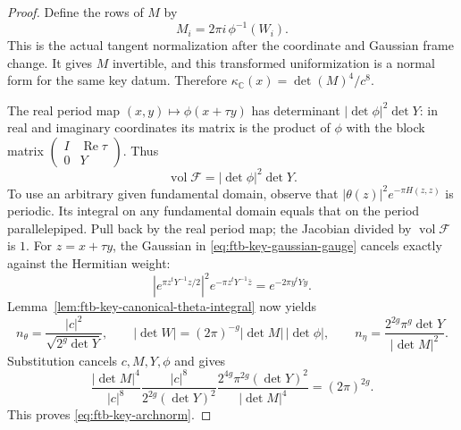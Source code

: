 \begin{proof}
Define the rows of \(M\) by
\[
                         M_i=2\pi i\,\phi^{-1}(W_i).
\]
This is the actual tangent normalization after the
coordinate and Gaussian frame change.
It gives \(M\) invertible, and this transformed
uniformization is a normal form for the same key datum.
Therefore \(\kappa_{\mathbb C}(x)=\det(M)^4/c^8\).

The real period map
\((x,y)\mapsto\phi(x+\tau y)\) has determinant
\(|\det\phi|^2\det Y\): in real and imaginary coordinates
its matrix is the product of \(\phi\) with the block
matrix \(\left(\begin{smallmatrix}I&\operatorname{Re}\tau\\0&Y
\end{smallmatrix}\right)\).
Thus
\[
                    \operatorname{vol}\mathcal F
                                   =|\det\phi|^2\det Y.
 \tag{A5}\label{eq:ftb-key-period-volume}
\]
To use an arbitrary given fundamental domain, observe
that \(|\theta(z)|^2e^{-\pi H(z,z)}\) is periodic.
Its integral on any fundamental domain equals that on
the period parallelepiped.  Pull back by the real period
map; the Jacobian divided by
\(\operatorname{vol}\mathcal F\) is \(1\).
For \(z=x+\tau y\), the Gaussian in
\eqref{eq:ftb-key-gaussian-gauge} cancels exactly against
the Hermitian weight:
\[
 |e^{\pi z^tY^{-1}z/2}|^2e^{-\pi z^tY^{-1}\bar z}
                                     =e^{-2\pi y^tYy}.
\]
Lemma~\ref{lem:ftb-key-canonical-theta-integral} now yields
\[
 n_\theta=\frac{|c|^2}{\sqrt{2^g\det Y}},\qquad
 |\det W|=(2\pi)^{-g}|\det M|\,|\det\phi|,
 \qquad
 n_\eta=\frac{2^{2g}\pi^g\det Y}{|\det M|^2}.
\]
Substitution cancels \(c,M,Y,\phi\) and gives
\[
 \frac{|\det M|^4}{|c|^8}
 \frac{|c|^8}{2^{2g}(\det Y)^2}
 \frac{2^{4g}\pi^{2g}(\det Y)^2}{|\det M|^4}
                                      =(2\pi)^{2g}.
\]
This proves \eqref{eq:ftb-key-archnorm}.
\end{proof}

